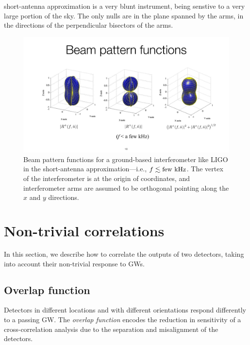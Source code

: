 short-antenna approximation is a very blunt instrument,
being senstive to a very large portion of the sky. 
The only nulls are in the plane spanned by the arms, 
in the directions of the perpendicular bisectors of 
the arms.
%
\begin{figure}[htbp!]
\begin{center}
\includegraphics[width=\textwidth]{Figures/LIGO_beam_patterns}
\caption{Beam pattern functions for a ground-based interferometer
like LIGO in the short-antenna approximation---i.e., $f\lesssim {\rm few\ kHz}$.
The vertex of the interferometer is at the origin of coordinates,
and interferometer arms are assumed to be orthogonal pointing along
the $x$ and $y$ directions.}
\label{f:LIGO_beam_patterns}
\end{center}
\end{figure}
%

\section{Non-trivial correlations}
\label{s:nontrivial_correlations}

In this section, we describe how to correlate the outputs
of two detectors, taking into account their non-trivial
response to GWs.

\subsection{Overlap function}

Detectors in different locations and with different 
orientations respond differently to a passing GW.
The {\em overlap function} encodes the reduction in 
sensitivity of a cross-correlation analysis due to 
the separation and misalignment of the detectors.

